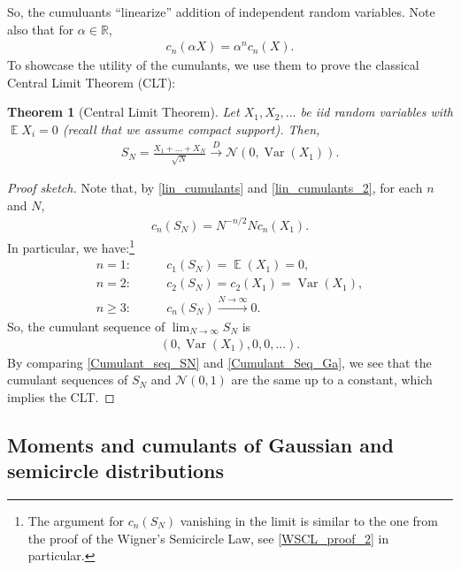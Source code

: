 \documentclass[letterpaper,11pt,oneside,reqno]{amsart}
\numberwithin{equation}{section}
\DeclareMathOperator{\EE}{\mathbb{E}}
\DeclareMathOperator{\VAR}{\mathrm{Var}}
\newtheorem{theorem}[proposition]{Theorem}
\theoremstyle{definition}
\begin{document}
So, the cumuluants ``linearize'' addition of independent random variables. 
Note also that for $\alpha\in \mathbb{R}$, 
\begin{align}\label{lin_cumulants_2}
	c_n(\alpha X)=\alpha^nc_n(X).
\end{align}
To showcase the utility of the cumulants, we use them to prove the classical Central Limit Theorem (CLT):
\begin{theorem}[Central Limit Theorem]\label{thm:classic_clt}
	Let $X_1, X_2, ...$ be iid random variables with $\EE X_i=0$ (recall that we assume compact support). Then, 
	\begin{align*}
		S_N=\frac{X_1+...+X_N}{\sqrt{N}}\xrightarrow{\ D\ } \mathcal{N}(0,\VAR(X_1)).
	\end{align*}
\end{theorem}
\begin{proof}[Proof sketch]
	Note that, by \eqref{lin_cumulants} and \eqref{lin_cumulants_2}, for each $n$ and $N$, 
	\begin{align*}
	c_n(S_N)=N^{-n/2}Nc_n(X_1).
	\end{align*}
	In particular, we have:\footnote{The argument for $c_n(S_N)$ vanishing in the limit is similar to the one from 
	the proof of the Wigner's Semicircle Law, see 
	\eqref{WSCL_proof_2} in particular.} 
	\begin{align*}
	    n=1 :&\qquad  c_1(S_N) = \EE(X_1)=0,\\
	    n=2 :&\qquad  c_2(S_N) =c_2(X_1)=\VAR(X_1),\\
	     n\geq 3  :&\qquad c_n(S_N)\xrightarrow{N\to\infty} 0.
	\end{align*}
	So, the cumulant sequence of $\displaystyle \lim_{N\to\infty} S_N$ is 
	\begin{align}\label{Cumulant_seq_SN}
		(0, \VAR(X_1), 0, 0, ...).
	\end{align}
	By comparing \eqref{Cumulant_seq_SN} and \eqref{Cumulant_Seq_Ga}, we see that the cumulant sequences of $S_N$ and $\mathcal{N}(0,1)$ are the same up to a constant, which implies the CLT.
\end{proof}


\subsection{Moments and cumulants of Gaussian and semicircle distributions} %
\label{sub:moments_and_cumulants_of_gaussian_and_semicircle_distributions}
\end{document}
